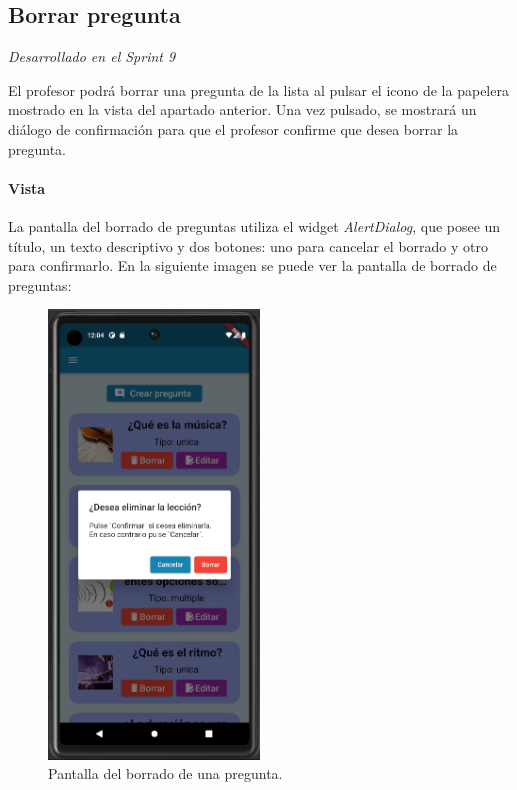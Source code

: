 \newpage
\subsection{Borrar pregunta} 

\textit{Desarrollado en el Sprint 9}

El profesor podrá borrar una pregunta de la lista al pulsar el icono de la papelera mostrado en la vista del apartado anterior.
 Una vez pulsado, se mostrará un diálogo de confirmación para que el profesor confirme que desea borrar la pregunta.

\paragraph*{Vista}
La pantalla del borrado de preguntas utiliza el widget \textit{AlertDialog}, que posee
un título, un texto descriptivo y dos botones: uno para cancelar el borrado y otro para confirmarlo.
En la siguiente imagen se puede ver la pantalla de borrado de preguntas:


\begin{figure}[H]
  \centering
  \includegraphics[width=0.5\textwidth]{imagenes/c7/borrarpregunta.png}
  \caption{Pantalla del borrado de una pregunta.} 
  \label{fig:borradopregunta}
\end{figure}

